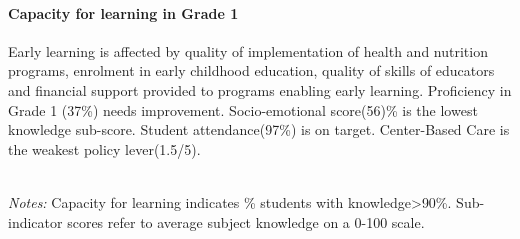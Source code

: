 \documentclass[
  twocolumn]{article}
\begin{document}
\hypertarget{capacity-for-learning-in-grade-1}{%
\paragraph{\texorpdfstring{\textbf{Capacity for learning in Grade
1}}{Capacity for learning in Grade 1}}\label{capacity-for-learning-in-grade-1}}

Early learning is affected by quality of implementation of health and
nutrition programs, enrolment in early childhood education, quality of
skills of educators and financial support provided to programs enabling
early learning. Proficiency in Grade 1 (37\%) needs improvement.
Socio-emotional score(56)\% is the lowest knowledge sub-score. Student
attendance(97\%) is on target. Center-Based Care is the weakest policy
lever(1.5/5).

\begin{table}[H]
\\
\color{darkgray}\scriptsize{\textit{Notes:} Capacity for learning indicates \% students with knowledge\textgreater{90\%}. Sub-indicator scores refer to average subject knowledge on a 0-100 scale.}
\end{table}
\raggedbottom
\end{document}
